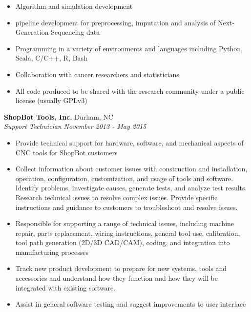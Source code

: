 \documentclass[11pt]{article}
\begin{document}
\begin{itemize}
\setlength{\itemsep}{1pt}

\item Algorithm and simulation development

\item pipeline development for preprocessing, imputation and analysis of Next-Generation Sequencing data

\item Programming in a variety of environments and languages including
Python, Scala, C/C++, R, Bash

\item Collaboration with cancer researchers and statisticians

\item All code produced to be shared with the research community under
a public license (usually GPLv3)

\end{itemize}
\vspace{10pt}


\noindent
{\bf ShopBot Tools, Inc.} \hfill Durham, NC\\
{\it Support Technician} \hfill {\it November 2013 - May 2015}

\begin{itemize}
\setlength{\itemsep}{1pt}

\item Provide technical support for hardware, software, and mechanical
aspects of CNC tools for ShopBot customers

\item Collect information about customer issues with construction and
installation, operation, configuration, customization, and usage of tools
and software. Identify problems, investigate causes, generate tests,
and analyze test results. Research technical issues to resolve complex
issues. Provide specific instructions and guidance to customers to
troubleshoot and resolve issues.

\item Responsible for supporting a range of technical issues, including
machine repair, parts replacement, wiring instructions, general tool use,
calibration, tool path generation (2D/3D CAD/CAM), coding, and integration
into manufacturing processes

\item Track new product development to prepare for new systems, tools and
accessories and understand how they function and how they will be integrated
  with existing software.
\item Assist in general software testing and suggest improvements to user
interface

\end{itemize}
\vspace{10pt}
\end{document}
